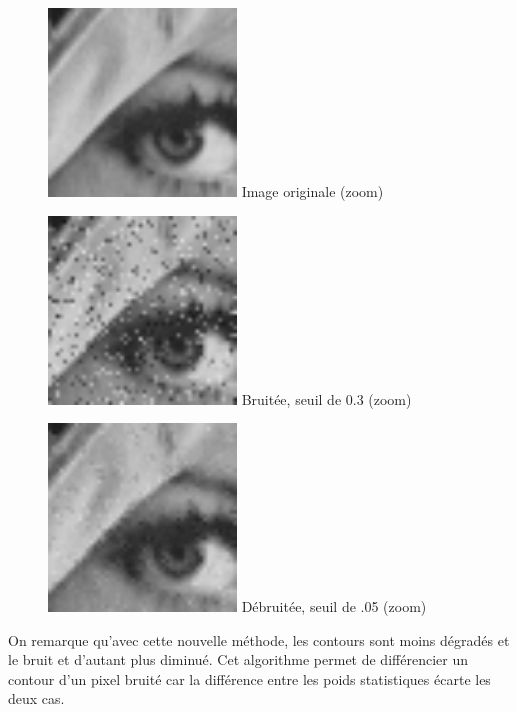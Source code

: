 \documentclass{article}
\begin{document}
		\begin{figure}[!ht]
			\centering
			\begin{minipage}[t]{5cm}
				\centering
				\includegraphics[width=5cm,height=5cm]{lenaZOOM.jpg}
				Image originale (zoom)
			\end{minipage}
			\begin{minipage}[t]{5cm}
				\centering
				\includegraphics[width=5cm,height=5cm]{Additive/noisy_30_ZOOM.jpg}
				Bruitée, seuil de 0.3 (zoom)
			\end{minipage}
			\begin{minipage}[t]{5cm}
				\centering
				\includegraphics[width=5cm,height=5cm]{Additive/algo2_30_ZOOM.jpg}
				Débruitée, seuil de .05 (zoom)
			\end{minipage}
		\end{figure}
		On remarque qu'avec cette nouvelle méthode, les contours sont moins dégradés et le bruit et d'autant plus diminué. Cet algorithme permet de différencier un contour d'un pixel bruité car la différence entre les poids statistiques écarte les deux cas.
	
\end{document}
